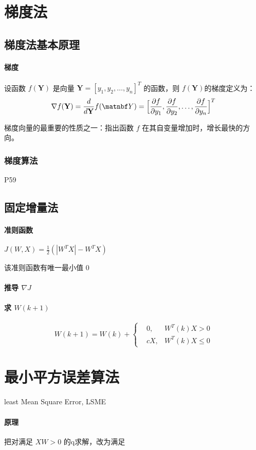 \documentclass[11pt]{book}
\begin{document}
\section{梯度法}

\subsection{梯度法基本原理}

\paragraph{梯度}%
\label{par:ti_du_}

设函数 $f(\mathbf{Y})$ 是向量 $\mathbf{Y} = [y_1, y_2, \ldots, y_n]^T$ 的函数，则 $f(\mathbf Y)$的梯度定义为：
$$
\nabla f(\mathbf Y) = \frac{d}{d \mathbf Y} f(\matnbf Y) = \Big[ \frac{\partial f}{\partial y_1} , \frac{\partial f}{\partial y_2} , \ldots, \frac{\partial f}{\partial y_n} \Big]^T
$$

梯度向量的最重要的性质之一：指出函数 $f$ 在其自变量增加时，增长最快的方向。

\subsubsection{梯度算法}%
\label{ssub:ti_du_suan_fa_}

P59

\subsection{固定增量法}

\paragraph{准则函数}%
\label{par:zhun_ze_han_shu_}

$J(W, X) = \frac{1}{2}(|W^T X| - W^T X)$

该准则函数有唯一最小值 $0$

\paragraph{推导 $\nabla J$}%
\label{par:tui_dao_nabla_j_}

\paragraph{求 $W(k+1)$}%
\label{par:qiu_w_k_1_}

$$
W(k+1) = W(k) + 
\left\{
\begin{aligned}
	& 0, &W^T(k) X > 0 \\
	& cX, & W^T(k) X \leq 0
\end{aligned}
\right.
$$
\section{最小平方误差算法}

least Mean Square Error, LSME

\paragraph{原理}%
\label{par:yuan_li_}

把对满足 $XW > 0$ 的q求解，改为满足
\end{document}
